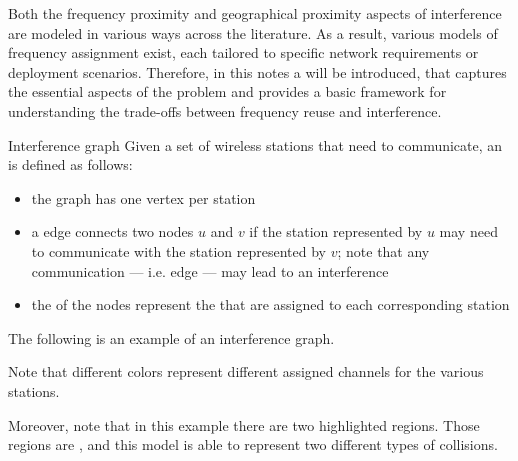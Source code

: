 \documentclass[a4paper, 12pt]{report}
\begin{document}
    Both the frequency proximity and geographical proximity aspects of interference are modeled in various ways across the literature. As a result, various models of frequency assignment exist, each tailored to specific network requirements or deployment scenarios. Therefore, in this notes a  will be introduced, that captures the essential aspects of the problem and provides a basic framework for understanding the trade-offs between frequency reuse and interference.

    \begin{frameddefn}{Interference graph}
        Given a set of wireless stations that need to communicate, an  is defined as follows:

        \begin{itemize}
            \item the graph has one vertex per station
            \item a  edge connects two nodes $u$ and $v$ if the station represented by $u$ may need to communicate with the station represented by $v$; note that any communication --- i.e. edge --- may lead to an interference
            \item the  of the nodes represent the  that are assigned to each corresponding station
        \end{itemize}
    \end{frameddefn}

    \begin{example}
        The following is an example of an interference graph.


        Note that different colors represent different assigned channels for the various stations.
    \end{example}

    Moreover, note that in this example there are two highlighted regions. Those regions are , and this model is able to represent two different types of collisions.
\end{document}
